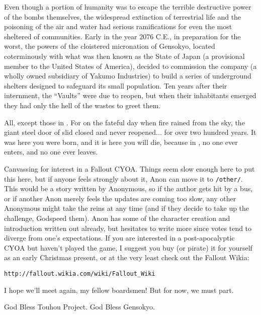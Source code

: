 \documentclass[a4paper,12pt]{article}
\begin{document}
Even though a portion of humanity was to escape the terrible destructive power of the bombs themselves, the widespread extinction of terrestrial life and the poisoning of the air and water had serious ramifications for even the most sheltered of communities. Early in the year 2076 C.E., in preparation for the worst, the powers of the cloistered micronation of Gensokyo, located coterminously with what was then known as the State of Japan (a provisional member to the United States of America), decided to commission the  company (a wholly owned subsidiary of Yakumo Industries) to build a series of underground shelters designed to safeguard its small population. Ten years after their internment, the ``Vaults'' were due to reopen, but when their inhabitants emerged they had only the hell of the wastes to greet them.

All, except those in \vaultnine. For on the fateful day when fire rained from the sky, the giant steel door of \vaultnine{} slid closed and never reopened... for over two hundred years. It was here you were born, and it is here you will die, because in \vaultnine, no one ever enters, and no one ever leaves.


\begin{commentary}
Canvassing for interest in a Fallout CYOA. Things seem slow enough here to put this here, but if anyone feels strongly about it, Anon can move it to \verb|/other/|. This would be a story written by Anonymous, so if the author gets hit by a bus, or if another Anon merely feels the updates are coming too slow, any other Anonymous might take the reins at any time (and if they decide to take up the challenge, Godspeed them). Anon has some of the character creation and introduction written out already, but hesitates to write more since votes tend to diverge from one's expectations. If you are interested in a post-apocalyptic CYOA but haven't played the game, I suggest you buy (or pirate) it for yourself as an early Christmas present, or at the very least check out the Fallout Wikia:

\verb|http://fallout.wikia.com/wiki/Fallout_Wiki|

I hope we'll meet again, my fellow boardsmen! But for now, we must part.

God Bless Touhou Project. God Bless Gensokyo.
\end{commentary}
\end{document}
